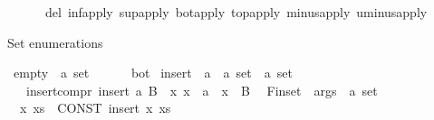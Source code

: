 \begin{isabellebody}
\ \ \ \ \ \ del{\isacharcolon}{\kern0pt}\ inf{\isacharunderscore}{\kern0pt}apply\ sup{\isacharunderscore}{\kern0pt}apply\ bot{\isacharunderscore}{\kern0pt}apply\ top{\isacharunderscore}{\kern0pt}apply\ minus{\isacharunderscore}{\kern0pt}apply\ uminus{\isacharunderscore}{\kern0pt}apply{\isacharparenright}{\kern0pt}%
\endisatagproof
{\isafoldproof}%
%
\isadelimproof
\isanewline
%
\endisadelimproof
\isanewline
{}\isamarkupfalse%
%
\begin{isamarkuptext}%
Set enumerations%
\end{isamarkuptext}\isamarkuptrue%
\isamarkupfalse%
\ empty\ {\isacharcolon}{\kern0pt}{\isacharcolon}{\kern0pt}\ {\isachardoublequoteopen}{\isacharprime}{\kern0pt}a\ set{\isachardoublequoteclose}\ {\isacharparenleft}{\kern0pt}{\isachardoublequoteopen}{\isacharbraceleft}{\kern0pt}{\isacharbraceright}{\kern0pt}{\isachardoublequoteclose}{\isacharparenright}{\kern0pt}\isanewline
\ \ \ {\isachardoublequoteopen}{\isacharbraceleft}{\kern0pt}{\isacharbraceright}{\kern0pt}\ {\isasymequiv}\ bot{\isachardoublequoteclose}\isanewline
\isanewline
{}\isamarkupfalse%
\ insert\ {\isacharcolon}{\kern0pt}{\isacharcolon}{\kern0pt}\ {\isachardoublequoteopen}{\isacharprime}{\kern0pt}a\ {\isasymRightarrow}\ {\isacharprime}{\kern0pt}a\ set\ {\isasymRightarrow}\ {\isacharprime}{\kern0pt}a\ set{\isachardoublequoteclose}\isanewline
\ \ \ insert{\isacharunderscore}{\kern0pt}compr{\isacharcolon}{\kern0pt}\ {\isachardoublequoteopen}insert\ a\ B\ {\isacharequal}{\kern0pt}\ {\isacharbraceleft}{\kern0pt}x{\isachardot}{\kern0pt}\ x\ {\isacharequal}{\kern0pt}\ a\ {\isasymor}\ x\ {\isasymin}\ B{\isacharbraceright}{\kern0pt}{\isachardoublequoteclose}\isanewline
\isanewline
{}\isamarkupfalse%
\isanewline
\ \ {\isachardoublequoteopen}{\isacharunderscore}{\kern0pt}Finset{\isachardoublequoteclose}\ {\isacharcolon}{\kern0pt}{\isacharcolon}{\kern0pt}\ {\isachardoublequoteopen}args\ {\isasymRightarrow}\ {\isacharprime}{\kern0pt}a\ set{\isachardoublequoteclose}\ \ \ \ {\isacharparenleft}{\kern0pt}{\isachardoublequoteopen}{\isacharbraceleft}{\kern0pt}{\isacharparenleft}{\kern0pt}{\isacharunderscore}{\kern0pt}{\isacharparenright}{\kern0pt}{\isacharbraceright}{\kern0pt}{\isachardoublequoteclose}{\isacharparenright}{\kern0pt}\isanewline
{}\isamarkupfalse%
\isanewline
\ \ {\isachardoublequoteopen}{\isacharbraceleft}{\kern0pt}x{\isacharcomma}{\kern0pt}\ xs{\isacharbraceright}{\kern0pt}{\isachardoublequoteclose}\ {\isasymrightleftharpoons}\ {\isachardoublequoteopen}CONST\ insert\ x\ {\isacharbraceleft}{\kern0pt}xs{\isacharbraceright}{\kern0pt}{\isachardoublequoteclose}\isanewline

\end{isabellebody}
